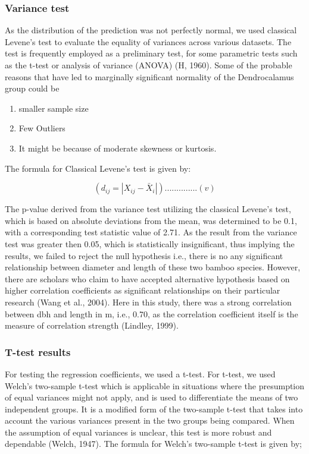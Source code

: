 \documentclass[preprint, 3p,
authoryear]{elsarticle} %
\begin{document}
\hypertarget{variance-test}{%
\subsubsection{Variance test}\label{variance-test}}

As the distribution of the prediction was not perfectly normal, we used
classical Levene's test to evaluate the equality of variances across
various datasets. The test is frequently employed as a preliminary test,
for some parametric tests such as the t-test or analysis of variance
(ANOVA) (H, 1960). Some of the probable reasons that have led to
marginally significant normality of the Dendrocalamus group could be

\begin{enumerate}
\def\labelenumi{\alph{enumi}.}
\item
  smaller sample size
\item
  Few Outliers
\item
  It might be because of moderate skewness or kurtosis.
\end{enumerate}

The formula for Classical Levene's test is given by:

\[( d_{ij} = |X_{ij} - \bar{X}_i| ) ..............(v)\]

The p-value derived from the variance test utilizing the classical
Levene's test, which is based on absolute deviations from the mean, was
determined to be 0.1, with a corresponding test statistic value of 2.71.
As the result from the variance test was greater then 0.05, which is
statistically insignificant, thus implying the results, we failed to
reject the null hypothesis i.e., there is no any significant
relationship between diameter and length of these two bamboo species.
However, there are scholars who claim to have accepted alternative
hypothesis based on higher correlation coefficients as significant
relationships on their particular research (Wang et al., 2004). Here in
this study, there was a strong correlation between dbh and length in m,
i.e., 0.70, as the correlation coefficient itself is the measure of
correlation strength (Lindley, 1999).

\hypertarget{t-test-results}{%
\subsubsection{T-test results}\label{t-test-results}}

For testing the regression coefficients, we used a t-test. For t-test,
we used Welch's two-sample t-test which is applicable in situations
where the presumption of equal variances might not apply, and is used to
differentiate the means of two independent groups. It is a modified form
of the two-sample t-test that takes into account the various variances
present in the two groups being compared. When the assumption of equal
variances is unclear, this test is more robust and dependable (Welch,
1947). The formula for Welch's two-sample t-test is given by;
\end{document}
